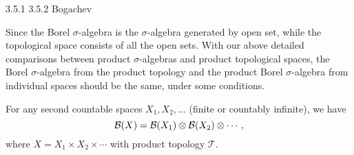 3.5.1 3.5.2 Bogachev

Since the Borel $\sigma$-algebra is the $\sigma$-algebra generated by open set, while the topological space consists of all the open sets. With our above detailed comparisons between product $\sigma$-algebras and product topological spaces, the Borel $\sigma$-algebra from the product topology and the product Borel $\sigma$-algebra from individual spaces should be the same, under some conditions.

\begin{thm}
    For any second countable spaces $X_1,X_2,\dotsc$ (finite or countably infinite), we have \begin{equation} \label{eq:borel-prod-agreement}
        \B(X) = \B(X_1) \otimes \B(X_2) \otimes \dotsb,
    \end{equation} where $X = X_1 \times X_2 \times \dotsb$ with product topology $\mathcal{T}$.
\end{thm}
